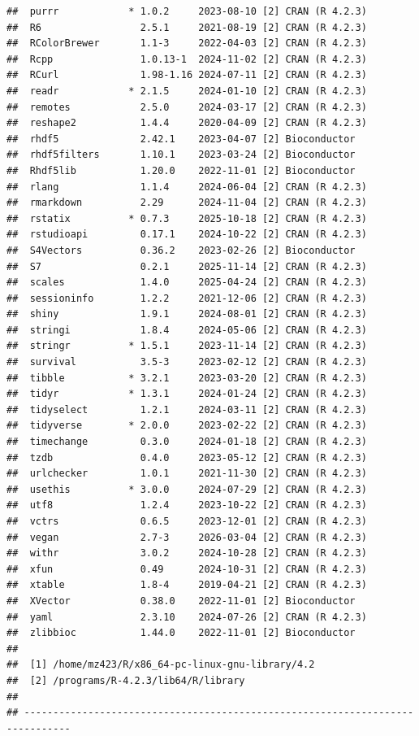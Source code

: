 \documentclass[
]{article}
\begin{document}
\begin{verbatim}
##  purrr            * 1.0.2     2023-08-10 [2] CRAN (R 4.2.3)
##  R6                 2.5.1     2021-08-19 [2] CRAN (R 4.2.3)
##  RColorBrewer       1.1-3     2022-04-03 [2] CRAN (R 4.2.3)
##  Rcpp               1.0.13-1  2024-11-02 [2] CRAN (R 4.2.3)
##  RCurl              1.98-1.16 2024-07-11 [2] CRAN (R 4.2.3)
##  readr            * 2.1.5     2024-01-10 [2] CRAN (R 4.2.3)
##  remotes            2.5.0     2024-03-17 [2] CRAN (R 4.2.3)
##  reshape2           1.4.4     2020-04-09 [2] CRAN (R 4.2.3)
##  rhdf5              2.42.1    2023-04-07 [2] Bioconductor
##  rhdf5filters       1.10.1    2023-03-24 [2] Bioconductor
##  Rhdf5lib           1.20.0    2022-11-01 [2] Bioconductor
##  rlang              1.1.4     2024-06-04 [2] CRAN (R 4.2.3)
##  rmarkdown          2.29      2024-11-04 [2] CRAN (R 4.2.3)
##  rstatix          * 0.7.3     2025-10-18 [2] CRAN (R 4.2.3)
##  rstudioapi         0.17.1    2024-10-22 [2] CRAN (R 4.2.3)
##  S4Vectors          0.36.2    2023-02-26 [2] Bioconductor
##  S7                 0.2.1     2025-11-14 [2] CRAN (R 4.2.3)
##  scales             1.4.0     2025-04-24 [2] CRAN (R 4.2.3)
##  sessioninfo        1.2.2     2021-12-06 [2] CRAN (R 4.2.3)
##  shiny              1.9.1     2024-08-01 [2] CRAN (R 4.2.3)
##  stringi            1.8.4     2024-05-06 [2] CRAN (R 4.2.3)
##  stringr          * 1.5.1     2023-11-14 [2] CRAN (R 4.2.3)
##  survival           3.5-3     2023-02-12 [2] CRAN (R 4.2.3)
##  tibble           * 3.2.1     2023-03-20 [2] CRAN (R 4.2.3)
##  tidyr            * 1.3.1     2024-01-24 [2] CRAN (R 4.2.3)
##  tidyselect         1.2.1     2024-03-11 [2] CRAN (R 4.2.3)
##  tidyverse        * 2.0.0     2023-02-22 [2] CRAN (R 4.2.3)
##  timechange         0.3.0     2024-01-18 [2] CRAN (R 4.2.3)
##  tzdb               0.4.0     2023-05-12 [2] CRAN (R 4.2.3)
##  urlchecker         1.0.1     2021-11-30 [2] CRAN (R 4.2.3)
##  usethis          * 3.0.0     2024-07-29 [2] CRAN (R 4.2.3)
##  utf8               1.2.4     2023-10-22 [2] CRAN (R 4.2.3)
##  vctrs              0.6.5     2023-12-01 [2] CRAN (R 4.2.3)
##  vegan              2.7-3     2026-03-04 [2] CRAN (R 4.2.3)
##  withr              3.0.2     2024-10-28 [2] CRAN (R 4.2.3)
##  xfun               0.49      2024-10-31 [2] CRAN (R 4.2.3)
##  xtable             1.8-4     2019-04-21 [2] CRAN (R 4.2.3)
##  XVector            0.38.0    2022-11-01 [2] Bioconductor
##  yaml               2.3.10    2024-07-26 [2] CRAN (R 4.2.3)
##  zlibbioc           1.44.0    2022-11-01 [2] Bioconductor
## 
##  [1] /home/mz423/R/x86_64-pc-linux-gnu-library/4.2
##  [2] /programs/R-4.2.3/lib64/R/library
## 
## ------------------------------------------------------------------------------
\end{verbatim}
\end{document}

